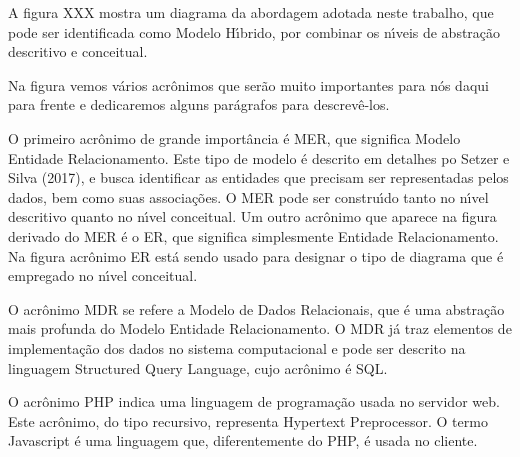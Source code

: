 \documentclass[
12pt,		%
openright,	%
twoside,  %
a4paper,			%
chapter=TITLE,		%
english,			%
french,				%
spanish,			%
brazil				%
]{USPSC-classe/USPSC}
\begin{document}
A figura XXX mostra um diagrama da abordagem adotada neste trabalho, que pode ser identificada como \textquotedbl Modelo H\'{\i}brido\textquotedbl , por combinar os n\'{\i}veis de abstra\c{c}\~ao descritivo e conceitual.














Na figura vemos v\'arios acr\^onimos que ser\~ao muito importantes para n\'os daqui para frente e dedicaremos alguns par\'agrafos para descrev\^e-los.














O primeiro acr\^onimo de grande import\^ancia \'e MER, que significa Modelo Entidade Relacionamento. Este tipo de modelo \'e descrito em detalhes po  Setzer e Silva (2017), e busca identificar as entidades que precisam ser representadas pelos dados, bem como suas associa\c{c}\~oes. O MER pode ser constru\'{\i}do tanto no n\'{\i}vel descritivo quanto no n\'{\i}vel conceitual. Um outro acr\^onimo que aparece na figura derivado do MER \'e o ER, que significa simplesmente \textquotedbl Entidade Relacionamento\textquotedbl . Na figura acr\^onimo ER est\'a sendo usado para designar o tipo de diagrama que \'e empregado no n\'{\i}vel conceitual.














O acr\^onimo MDR se refere a Modelo de Dados Relacionais, que \'e uma abstra\c{c}\~ao mais profunda do Modelo Entidade Relacionamento. O MDR j\'a traz elementos de implementa\c{c}\~ao dos dados no sistema computacional e pode ser descrito na linguagem Structured Query Language, cujo acr\^onimo \'e SQL.














O acr\^onimo PHP indica uma linguagem de programa\c{c}\~ao usada no servidor web. Este acr\^onimo, do tipo recursivo, representa Hypertext Preprocessor. O termo Javascript \'e uma linguagem que, diferentemente do PHP, \'e usada no cliente.
\end{document}
